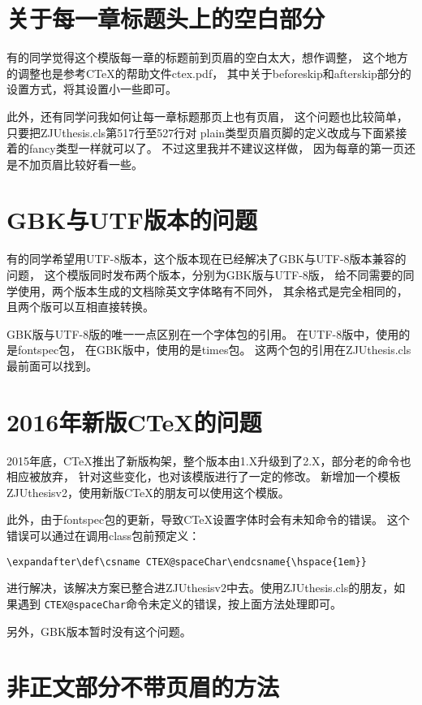 \section{关于每一章标题头上的空白部分}

有的同学觉得这个模版每一章的标题前到页眉的空白太大，想作调整，
这个地方的调整也是参考CTeX的帮助文件ctex.pdf，
其中关于beforeskip和afterskip部分的设置方式，将其设置小一些即可。

此外，还有同学问我如何让每一章标题那页上也有页眉，
这个问题也比较简单，只要把ZJUthesis.cls第517行至527行对
plain类型页眉页脚的定义改成与下面紧接着的fancy类型一样就可以了。
不过这里我并不建议这样做，
因为每章的第一页还是不加页眉比较好看一些。


\section{GBK与UTF版本的问题}

有的同学希望用UTF-8版本，这个版本现在已经解决了GBK与UTF-8版本兼容的问题，
这个模版同时发布两个版本，分别为GBK版与UTF-8版，
给不同需要的同学使用，两个版本生成的文档除英文字体略有不同外，
其余格式是完全相同的，
且两个版可以互相直接转换。

GBK版与UTF-8版的唯一一点区别在一个字体包的引用。
在UTF-8版中，使用的是fontspec包，
在GBK版中，使用的是times包。
这两个包的引用在ZJUthesis.cls最前面可以找到。


\section{2016年新版CTeX的问题}

2015年底，CTeX推出了新版构架，整个版本由1.X升级到了2.X，部分老的命令也相应被放弃，
针对这些变化，也对该模版进行了一定的修改。
新增加一个模板ZJUthesisv2，使用新版CTeX的朋友可以使用这个模版。

此外，由于fontspec包的更新，导致CTeX设置字体时会有未知命令的错误。
这个错误可以通过在调用class包前预定义：

\verb+\expandafter\def\csname CTEX@spaceChar\endcsname{\hspace{1em}}+

进行解决，该解决方案已整合进ZJUthesisv2中去。使用ZJUthesis.cls的朋友，如果遇到
\verb+CTEX@spaceChar+命令未定义的错误，按上面方法处理即可。

另外，GBK版本暂时没有这个问题。


\section{非正文部分不带页眉的方法}

